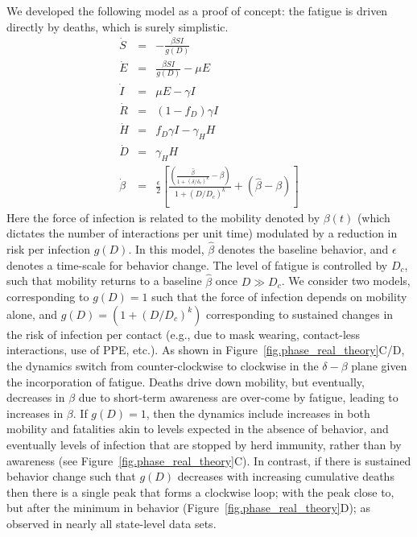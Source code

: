 We developed the following model as a proof of concept: the fatigue is driven directly by deaths, which is surely simplistic.
\begin{eqnarray}
\dot{S} &=& -\frac{\beta SI}{g(D)}\\
\dot{E} &=& \frac{\beta SI}{g(D)}-\mu E\\
\dot{I} &=& \mu E-\gamma I \\
\dot{R} &=& (1-f_D)\gamma I\\
\dot{H} &=& f_D\gamma I - \gamma_H H\\
\dot{D} &=& \gamma_H H \\
\dot{\beta} &=&\frac{\epsilon}{2}\left[\frac{\left(\frac{\hat{\beta}}{1+\left(\delta/\delta_c\right)^{k}}-\beta\right)}{1+\left(D/D_c\right)^k}+\left(\hat{\beta}-\beta\right)\right] \label{eq.fatigue}
\end{eqnarray}
Here the force of infection is related to the
mobility denoted by $\beta(t)$ (which dictates
the number of interactions per unit time) modulated by
a reduction in risk per infection $g(D)$.
In this model,
$\hat{\beta}$ denotes the baseline behavior,
and $\epsilon$ denotes a time-scale for behavior change.  
The level of fatigue is controlled by $D_c$, such that
mobility returns to a baseline $\hat{\beta}$ once $D\gg D_c$.
We consider two models, corresponding to
$g(D)=1$ such that the force of infection depends on mobility alone,
and 
$g(D)=\left(1+(D/D_c)^k\right)$
corresponding to sustained changes in the risk of infection
per contact (e.g., due to mask wearing, contact-less
interactions, use of PPE, etc.). 
As shown in Figure~\ref{fig.phase_real_theory}C/D, the dynamics 
switch from counter-clockwise to clockwise in the $\delta-\beta$ plane
given the incorporation of fatigue.
Deaths drive down mobility, but eventually,
decreases in $\beta$ due to short-term awareness
are over-come by fatigue, leading to increases in $\beta$.
If $g(D)=1$, then 
the dynamics include increases in both mobility and fatalities
akin to levels expected in the absence of behavior, and eventually
levels of infection that are stopped by herd immunity, rather than by 
awareness (see Figure~\ref{fig.phase_real_theory}C).  
In contrast, if there is sustained behavior change
such that $g(D)$ decreases with increasing cumulative deaths
then there is a single peak that forms a clockwise loop; with
the peak close to, but after the minimum in behavior (Figure~\ref{fig.phase_real_theory}D); as observed in nearly all state-level data sets.

